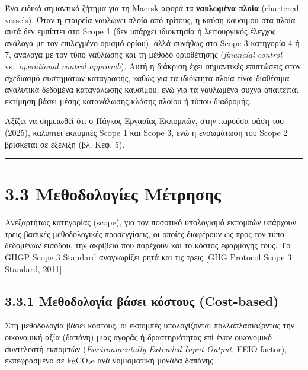 Ένα ειδικά σημαντικό ζήτημα για τη Maersk αφορά τα \textbf{ναυλωμένα
πλοία} (chartered vessels). Όταν η εταιρεία ναυλώνει πλοία από τρίτους,
η καύση καυσίμου στα πλοία αυτά δεν εμπίπτει στο Scope 1 (δεν υπάρχει
ιδιοκτησία ή λειτουργικός έλεγχος ανάλογα με τον επιλεγμένο ορισμό
ορίου), αλλά συνήθως στο Scope 3 κατηγορία 4 ή 7, ανάλογα με τον τύπο
ναύλωσης και τη μέθοδο οριοθέτησης (\emph{financial control}
vs.~\emph{operational control approach}). Αυτή η διάκριση έχει
σημαντικές επιπτώσεις στον σχεδιασμό συστημάτων καταγραφής, καθώς για τα
ιδιόκτητα πλοία είναι διαθέσιμα αναλυτικά δεδομένα κατανάλωσης καυσίμου,
ενώ για τα ναυλωμένα συχνά απαιτείται εκτίμηση βάσει μέσης κατανάλωσης
κλάσης πλοίου ή τύπου διαδρομής.

Αξίζει να σημειωθεί ότι ο Πάγκος Εργασίας Εκπομπών, στην παρούσα φάση
του (2025), καλύπτει εκπομπές Scope 1 και Scope 3, ενώ η ενσωμάτωση του
Scope 2 βρίσκεται σε εξέλιξη (βλ. Κεφ. 5).

\begin{center}\rule{0.5\linewidth}{0.5pt}\end{center}

\section{3.3 Μεθοδολογίες
Μέτρησης}\label{ux3bcux3b5ux3b8ux3bfux3b4ux3bfux3bbux3bfux3b3ux3afux3b5ux3c2-ux3bcux3adux3c4ux3c1ux3b7ux3c3ux3b7ux3c2}

Ανεξαρτήτως κατηγορίας (scope), για τον ποσοτικό υπολογισμό εκπομπών
υπάρχουν τρεις βασικές μεθοδολογικές προσεγγίσεις, οι οποίες διαφέρουν
ως προς τον τύπο δεδομένων εισόδου, την ακρίβεια που παρέχουν και το
κόστος εφαρμογής τους. Το GHGP Scope 3 Standard αναγνωρίζει ρητά και τις
τρεις {[}GHG Protocol Scope 3 Standard, 2011{]}.

\subsection{3.3.1 Μεθοδολογία βάσει κόστους
(Cost-based)}\label{ux3bcux3b5ux3b8ux3bfux3b4ux3bfux3bbux3bfux3b3ux3afux3b1-ux3b2ux3acux3c3ux3b5ux3b9-ux3baux3ccux3c3ux3c4ux3bfux3c5ux3c2-cost-based}

Στη μεθοδολογία βάσει κόστους, οι εκπομπές υπολογίζονται
πολλαπλασιάζοντας την οικονομική αξία (δαπάνη) μιας αγοράς ή
δραστηριότητας επί έναν οικονομικό συντελεστή εκπομπών
(\emph{Environmentally Extended Input-Output}, EEIO factor),
εκπεφρασμένο σε kgCO₂e ανά νομισματική μονάδα δαπάνης.

